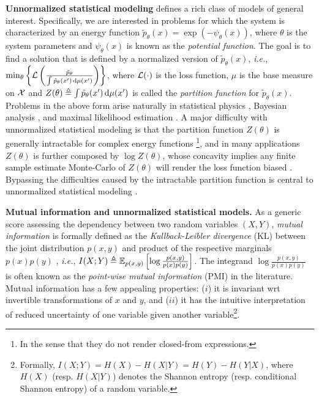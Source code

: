 \documentclass{article}
\theoremstyle{plain}
\theoremstyle{definition}
\theoremstyle{remark}
\newcommand{\PMI}{\text{PMI}}
\begin{document}
	{\bf Unnormalized statistical modeling} defines a rich class of models of general interest. Specifically, we are interested in  problems for which the system is characterized by an energy function $\tilde{p}_{\theta}(x) =  \exp(-\psi_\theta(x))$, where $\theta$ is the system parameters and $\psi_{\theta}(x)$ is known as the {\it potential function}. The goal is to find a solution that is defined by a normalized version of $\tilde{p}_{\theta}(x)$, {\it i.e.}, $\min_{\theta} \left\{ \mathcal{L}\left( \frac{\tilde{p}_{\theta}}{\int \tilde{p}_{\theta}(x') \,\text{d} \mu(x')}\right)\right\}$, 
	where $\mathcal{L}(\cdot)$ is the loss function, $\mu$ is the base measure on $\mathcal{X}$ and $Z(\theta) \triangleq \int \tilde{p}_{\theta}(x') \,\text{d} \mu(x')$ is called the {\it partition function} for $\tilde{p}_{\theta}(x)$. 
	Problems in the above form arise naturally in statistical physics \citep{reichl2016modern}, Bayesian analysis \citep{berger2013statistical}, and maximal likelihood estimation \citep{tao2019fenchel}. A major difficulty with unnormalized statistical modeling is that the partition function $Z(\theta)$ is generally intractable for complex energy functions \footnote{In the sense that they do not render closed-from expressions.}, and in many applications $Z(\theta)$ is further composed by $\log Z(\theta)$, whose concavity implies any finite sample estimate Monte-Carlo of $Z(\theta)$ will render the loss function biased \citep{rainforth2018nesting, zheng2018robust}. Bypassing the difficulties caused by the intractable partition function is central to unnormalized statistical modeling \citep{geyer1994convergence, neal2001annealed, hinton2002training, hyvarinen2005estimation, gutmann2010noise}.
	
	{\bf Mutual information and unnormalized statistical models.} %
	As a generic score assessing the dependency between two random variables $(X,Y)$, {\it mutual information} is formally defined as the {\it Kullback-Leibler divergence} (KL) between the joint distribution $p(x,y)$ and product of the respective marginals $p(x)p(y)$ \citep{shannon1948mathematical}, {\it i.e.}, $I(X;Y) \triangleq \mathbb{E}_{p(x,y)}\left[\log \frac{p(x,y)}{p(x)p(y)}\right]$. The integrand $\log \frac{p(x,y)}{p(x)p(y)}$ is often known as the {\it point-wise mutual information} ($\PMI$) in the literature. Mutual information has a few appealing properties: ($i$) it is invariant wrt invertible transformations of $x$ and $y$, and ($ii$) it has the intuitive interpretation of reduced uncertainty of one variable given another variable\footnote{Formally, $I(X;Y) = H(X) - H(X|Y) = H(Y) - H(Y|X)$, where $H(X)$ (resp. $H(X|Y)$) denotes the Shannon entropy (resp. conditional Shannon entropy) of a random variable.}. 
	
\end{document}
